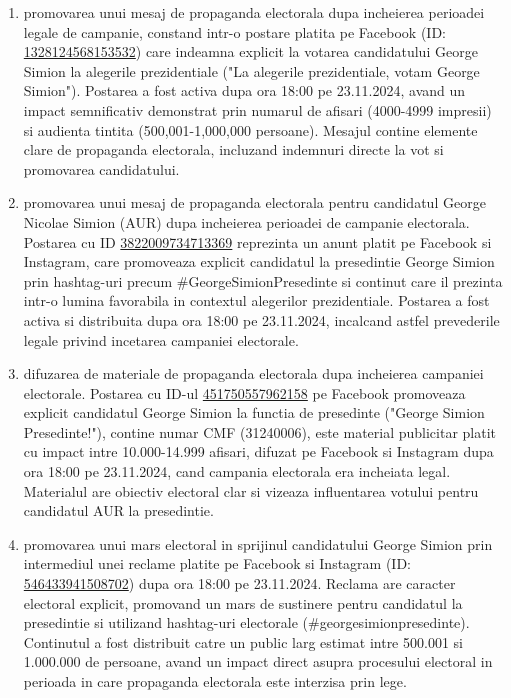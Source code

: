 \documentclass[a4paper,12pt]{article}
\begin{document}
\begin{enumerate}[leftmargin=*, label=\arabic*.)]
    \item promovarea unui mesaj de propaganda electorala dupa incheierea perioadei legale de campanie, constand intr-o postare platita pe Facebook (ID: \href{https://www.facebook.com/ads/library/?id=1328124568153532}{1328124568153532}) care indeamna explicit la votarea candidatului George Simion la alegerile prezidentiale ("La alegerile prezidentiale, votam George Simion"). Postarea a fost activa dupa ora 18:00 pe 23.11.2024, avand un impact semnificativ demonstrat prin numarul de afisari (4000-4999 impresii) si audienta tintita (500,001-1,000,000 persoane). Mesajul contine elemente clare de propaganda electorala, incluzand indemnuri directe la vot si promovarea candidatului.
    \item promovarea unui mesaj de propaganda electorala pentru candidatul George Nicolae Simion (AUR) dupa incheierea perioadei de campanie electorala. Postarea cu ID \href{https://www.facebook.com/ads/library/?id=3822009734713369}{3822009734713369} reprezinta un anunt platit pe Facebook si Instagram, care promoveaza explicit candidatul la presedintie George Simion prin hashtag-uri precum \#GeorgeSimionPresedinte si continut care il prezinta intr-o lumina favorabila in contextul alegerilor prezidentiale. Postarea a fost activa si distribuita dupa ora 18:00 pe 23.11.2024, incalcand astfel prevederile legale privind incetarea campaniei electorale.
    \item difuzarea de materiale de propaganda electorala dupa incheierea campaniei electorale. Postarea cu ID-ul \href{https://www.facebook.com/ads/library/?id=451750557962158}{451750557962158} pe Facebook promoveaza explicit candidatul George Simion la functia de presedinte ("George Simion Presedinte!"), contine numar CMF (31240006), este material publicitar platit cu impact intre 10.000-14.999 afisari, difuzat pe Facebook si Instagram dupa ora 18:00 pe 23.11.2024, cand campania electorala era incheiata legal. Materialul are obiectiv electoral clar si vizeaza influentarea votului pentru candidatul AUR la presedintie.
    \item promovarea unui mars electoral in sprijinul candidatului George Simion prin intermediul unei reclame platite pe Facebook si Instagram (ID: \href{https://www.facebook.com/ads/library/?id=546433941508702}{546433941508702}) dupa ora 18:00 pe 23.11.2024. Reclama are caracter electoral explicit, promovand un mars de sustinere pentru candidatul la presedintie si utilizand hashtag-uri electorale (\#georgesimionpresedinte). Continutul a fost distribuit catre un public larg estimat intre 500.001 si 1.000.000 de persoane, avand un impact direct asupra procesului electoral in perioada in care propaganda electorala este interzisa prin lege.
\end{enumerate}
\end{document}
